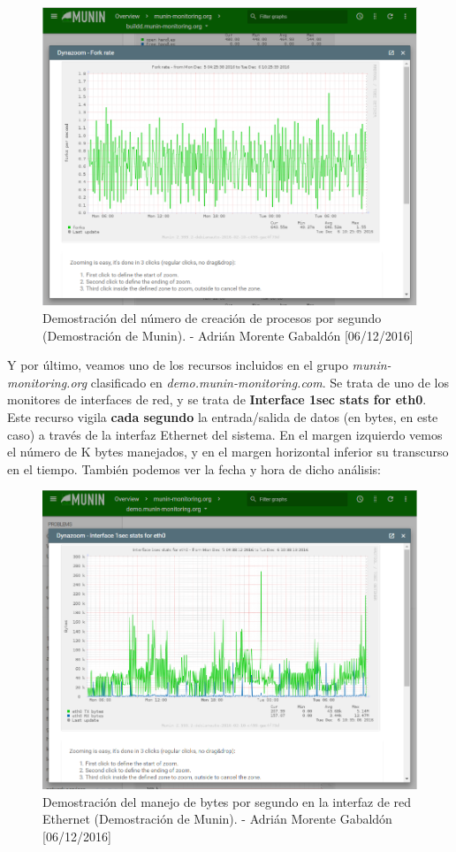 \begin{figure}[H]
	\centering
	\includegraphics[scale=0.5]{munin-forkrate}
	\caption{Demostración del número de creación de procesos por segundo (Demostración de Munin). - Adrián Morente Gabaldón [06/12/2016]}
	\label{figura5}
\end{figure}
Y por último, veamos uno de los recursos incluidos en el grupo \emph{munin-monitoring.org} clasificado en \emph{demo.munin-monitoring.com}. Se trata de uno de los monitores de interfaces de red, y se trata de \textbf{Interface 1sec stats for eth0}. Este recurso vigila \textbf{cada segundo} la entrada/salida de datos (en bytes, en este caso) a través de la interfaz Ethernet del sistema. En el margen izquierdo vemos el número de K bytes manejados, y en el margen horizontal inferior su transcurso en el tiempo. También podemos ver la fecha y hora de dicho análisis:
\begin{figure}[H]
	\centering
	\includegraphics[scale=0.5]{munin-network}
	\caption{Demostración del manejo de bytes por segundo en la interfaz de red Ethernet (Demostración de Munin). - Adrián Morente Gabaldón [06/12/2016]}
	\label{figura6}
\end{figure}

